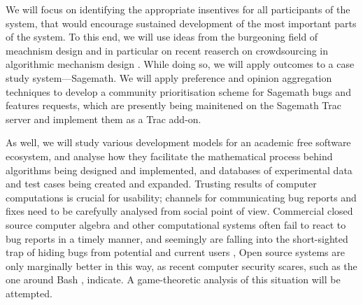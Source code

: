 \begin{workpackage}[id=social-aspects,wphases=12-24!.5,
  title=Social Aspects,
  UORM=1,USHRM=8]
\begin{wpdescription}
We will focus on identifying the appropriate insentives for all
participants of the system, that would encourage sustained development of the
most important parts of the system.  To this end, we will use ideas from the
burgeoning field of meachnism design \cite{AGTbook} and in
particular on recent reaserch on crowdsourcing in algorithmic mechanism design
\cite{crowds}.  While doing so, we will apply outcomes to a case study
system---Sagemath.
We will apply preference and opinion aggregation techniques \cite{pref-aggr} to  develop
a community prioritisation scheme for Sagemath bugs and features requests, which 
are presently being mainitened on the Sagemath Trac server \cite{trac-sagemath}  and implement
them as a Trac \cite{Trac} add-on.

As well, we will study various development models for an academic free software ecosystem,
and analyse how they facilitate the mathematical process behind algorithms being
designed and implemented,  and databases of experimental data and test cases being
created and expanded.
Trusting results of computer
computations is crucial for usability; channels for communicating bug reports
and fixes need to be carefyully analysed from social point of view. 
Commercial closed source computer algebra and other computational systems often
fail to react to bug reports in a timely manner, and seemingly are falling into the
short-sighted trap of hiding bugs from potential and current users \cite{misfort},
Open source  systems are only marginally better in this way, as recent
computer security scares, such as the one around Bash \cite{shellshock}, indicate.
A game-theoretic analysis of this situation will be attempted.
\end{wpdescription}


\end{workpackage}
